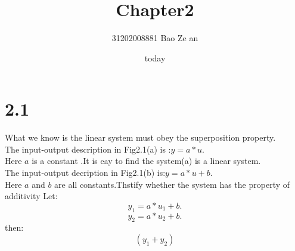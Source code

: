 \documentclass{article}
\title{Chapter2}
\author{31202008881        \quad \quad \quad
          Bao Ze an}
\date{today}
\begin{document}
\maketitle
\section*{2.1}
What we know is the linear system must obey the superposition property.\\
The input-output description in Fig2.1(a) is :$y=a*u$.\\
Here $a$ is a constant .It is eay to find the system(a) is a linear system.\\
The input-output decription in Fig2.1(b) is:$y=a*u+b$.\\
Here $a$ and $b$ are all constants.Thstify whether the system has the property of additivity
Let:
\[y_1=a*u_1+b.\]
\[y_2=a*u_2+b.\]
then:
\[(y_1+y_2)\]
\end{document}
